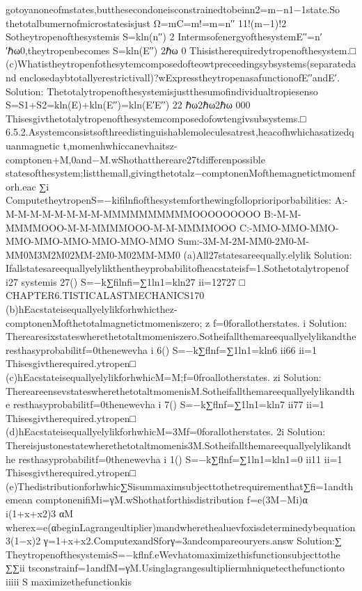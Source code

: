 {{{{{{{{{{gotoyanoneofmstates,butthesecondoneisconstrainedtobeinn2=m−n1−1state.So
thetotalbumernofmicrostatesisjust
Ω=mC=m!=m=n′′
11!(m−1)!2
Sotheytropenofthesystemis
S=kln(n′′)
2
IntermsofenergyofthesystemE′′=n′′ℏω0,theytropenbecomes
S=kln(E′′)
2ℏω
0
Thisistherequiredytropenofthesystem.□
(c)Whatistheytropenfothesytemcomposedofteowtpreceedingsybsystems(separatedand
enclosedaybtotallyerestrictivall)?wExpresstheytropenasafunctionofE′′andE′.
Solution:
Thetotalytropenofthesystemisjustthesumofindividualtropiesenso
S=S1+S2=kln(E)+kln(E′′)=kln(E′E′′)
22
ℏω2ℏω2ℏω
000
Thisesgivthetotalytropenofthesystemcomposedofowtengivsubsystems.□
6.5.2.Asystemconsistsofthreedistinguishablemoleculesatrest,heacofhwhichasatizedquanmagnetic
t,momenhwhiccanevhaitsz-comptonen+M,0and−M.wShothatthereare27tdifferenpossible
statesofthesystem;listthemall,givingthetotalz−comptonenMofthemagnetictmomenforh.eac
∑i
ComputetheytropenS=−kifilnfiofthesystemforthewingfolloprioriporbabilities:
A:-M-M-M-M-M-M-M-M-MMMMMMMMMMOOOOOOOOO
B:-M-M-MMMMOOO-M-M-MMMMOOO-M-M-MMMMOOO
C:-MMO-MMO-MMO-MMO-MMO-MMO-MMO-MMO-MMO
Sum:-3M-M-2M-MM0-2M0-M-MM0M3M2M02MM-2M0-M02MM-MM0
(a)All27statesareequally.elylik
Solution:
Ifallstatesareequallyelylikthentheyprobabilitofheacstateisf=1.Sothetotalytropenof
i27
systemis
27()
S=−k∑filnfi=∑1ln1=kln27
ii=12727
□
CHAPTER6.TISTICALASTMECHANICS170
(b)hEacstateisequallyelylikforhwhicthez-comptonenMofthetotalmagnetictmomeniszero;
z
f=0forallotherstates.
i
Solution:
Therearesixstateswherethetotaltmomeniszero.Sotheifallthemareequallyelylikandthe
resthasyprobabilitf=0thenewevha
i
6()
S=−k∑flnf=∑1ln1=kln6
ii66
ii=1
Thisesgivtherequired.ytropen□
(c)hEacstateisequallyelylikforhwhicM=M;f=0froallotherstates.
zi
Solution:
ThereareensevstateswherethetotaltmomenisM.Sotheifallthemareequallyelylikandthe
resthasyprobabilitf=0thenewevha
i
7()
S=−k∑flnf=∑1ln1=kln7
ii77
ii=1
Thisesgivtherequired.ytropen□
(d)hEacstateisequallyelylikforhwhicM=3Mf=0forallotherstates.
2i
Solution:
Thereisjustonestatewherethetotaltmomenis3M.Sotheifallthemareequallyelylikandthe
resthasyprobabilitf=0thenewevha
i
1()
S=−k∑flnf=∑1ln1=kln1=0
ii11
ii=1
Thisesgivtherequired.ytropen□
(e)Thedistributionforhwhic∑Sisummaximsubjecttothetrequirementhat∑fi=1andthemean
comptonenifiMi=γM.wShothatforthisdistribution
f=e(3M−Mi)α
i(1+x+x2)3
αM
wherex=e(αbeginLagrangeultiplier)mandwherethealuevfoxisdeterminedybequation
3(1−x)2
γ=1+x+x2.ComputexandSforγ=3andcompareouryers.answ
Solution:∑
TheytropenofthesystemisS=−kflnf.eWevhatomaximizethisfunctionsubjecttothe
∑∑ii
tsconstrainf=1andfM=γM.Usinglagrangesultipliermhniquetecthefunctionto
iiiii
S
maximizethefunctionkis
}}}}}}}}}}
